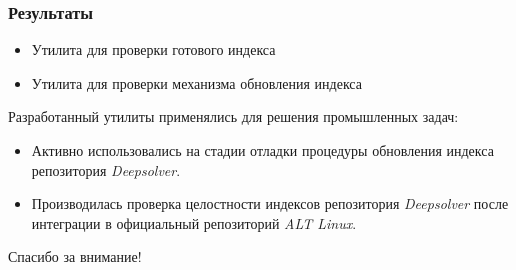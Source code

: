 \documentclass{beamer}
\begin{document}
\begin{frame}
\frametitle{Результаты}
\begin{itemize}
\item
Утилита для проверки готового индекса
\item
Утилита для проверки механизма обновления индекса
\end{itemize}


Разработанный утилиты применялись для решения промышленных задач:
\begin{itemize}
\item
Активно использовались на стадии отладки процедуры обновления индекса репозитория \textit{Deepsolver}.
\item
Производилась проверка целостности индексов репозитория \textit{Deepsolver} после интеграции в официальный репозиторий
\textit{ALT Linux}.

\end{itemize}
\end{frame}

\begin{frame}
{\Large Спасибо за внимание!}
\end{frame}
\end{document}
